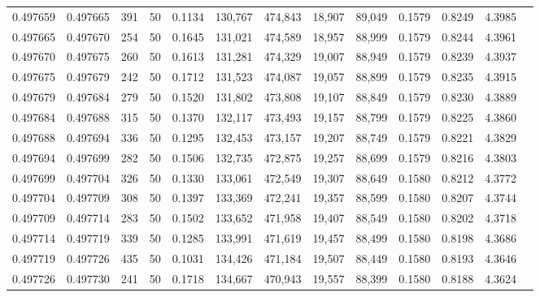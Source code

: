 \begin{tabular}{rrrrrrrrrrrrr}
0.497659 & 0.497665 & 391 &  50 &                                     0.1134 & 130,767 & 474,843 &  18,907 &  89,049 & 0.1579 & 0.8249 & 4.3985 \\
0.497665 & 0.497670 & 254 &  50 &                                     0.1645 & 131,021 & 474,589 &  18,957 &  88,999 & 0.1579 & 0.8244 & 4.3961 \\
0.497670 & 0.497675 & 260 &  50 &                                     0.1613 & 131,281 & 474,329 &  19,007 &  88,949 & 0.1579 & 0.8239 & 4.3937 \\
0.497675 & 0.497679 & 242 &  50 &                                     0.1712 & 131,523 & 474,087 &  19,057 &  88,899 & 0.1579 & 0.8235 & 4.3915 \\
0.497679 & 0.497684 & 279 &  50 &                                     0.1520 & 131,802 & 473,808 &  19,107 &  88,849 & 0.1579 & 0.8230 & 4.3889 \\
0.497684 & 0.497688 & 315 &  50 &                                     0.1370 & 132,117 & 473,493 &  19,157 &  88,799 & 0.1579 & 0.8225 & 4.3860 \\
0.497688 & 0.497694 & 336 &  50 &                                     0.1295 & 132,453 & 473,157 &  19,207 &  88,749 & 0.1579 & 0.8221 & 4.3829 \\
0.497694 & 0.497699 & 282 &  50 &                                     0.1506 & 132,735 & 472,875 &  19,257 &  88,699 & 0.1579 & 0.8216 & 4.3803 \\
0.497699 & 0.497704 & 326 &  50 &                                     0.1330 & 133,061 & 472,549 &  19,307 &  88,649 & 0.1580 & 0.8212 & 4.3772 \\
0.497704 & 0.497709 & 308 &  50 &                                     0.1397 & 133,369 & 472,241 &  19,357 &  88,599 & 0.1580 & 0.8207 & 4.3744 \\
0.497709 & 0.497714 & 283 &  50 &                                     0.1502 & 133,652 & 471,958 &  19,407 &  88,549 & 0.1580 & 0.8202 & 4.3718 \\
0.497714 & 0.497719 & 339 &  50 &                                     0.1285 & 133,991 & 471,619 &  19,457 &  88,499 & 0.1580 & 0.8198 & 4.3686 \\
0.497719 & 0.497726 & 435 &  50 &                                     0.1031 & 134,426 & 471,184 &  19,507 &  88,449 & 0.1580 & 0.8193 & 4.3646 \\
0.497726 & 0.497730 & 241 &  50 &                                     0.1718 & 134,667 & 470,943 &  19,557 &  88,399 & 0.1580 & 0.8188 & 4.3624 \\

\end{tabular}
